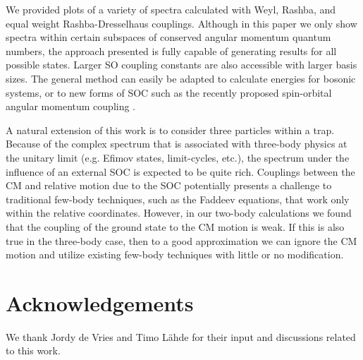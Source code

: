 \documentclass[%
 onecolumn,
 notitlepage,
 amsmath,amssymb,
 aps,
]{revtex4-1}
\begin{document}
We provided plots of a variety of spectra calculated with Weyl, Rashba, and equal weight Rashba-Dresselhaus couplings.  Although in this paper we only show spectra within certain subspaces of conserved angular momentum quantum numbers, the approach presented is fully capable of generating results for all possible states. Larger SO coupling constants are also accessible with larger basis sizes. The general method can easily be adapted to calculate energies for bosonic systems, or to new forms of SOC such as the recently proposed spin-orbital angular momentum coupling \cite{2014arXiv1411.1737S}.

A natural extension of this work is to consider three particles within a trap.  Because of the complex spectrum that is associated with three-body physics at the unitary limit (e.g. Efimov states, limit-cycles, etc.), the spectrum under the influence of an external SOC is expected to be quite rich.  Couplings between the CM and relative motion due to the SOC potentially presents a challenge to traditional few-body techniques, such as the Faddeev equations, that work only within the relative coordinates.  However, in our two-body calculations we found that the coupling of the ground state to the CM motion is weak. If this is also true in the three-body case, then to a good approximation we can ignore the CM motion and utilize existing few-body techniques with little or no modification.  

\section*{Acknowledgements}
We thank Jordy de Vries and Timo L{\"a}hde for their input and discussions related to this work.   



\appendix*
\end{document}
